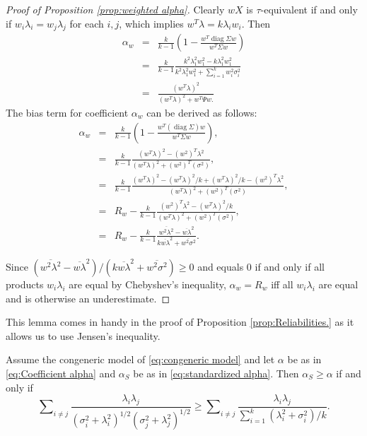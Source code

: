 \documentclass[twoside]{article}
\DeclareMathOperator{\diag}{diag}
\DeclareMathOperator{\tsum}{\textstyle \sum}
\renewcommand{\sqrt}[1]{{(#1)^{1/2}}}
\begin{document}
\begin{proof}[Proof of Proposition \ref{prop:weighted alpha}]
\label{proof:weighted alpha}Clearly $wX$ is $\tau$-equivalent
if and only if $w_{i}\lambda_{i}=w_{j}\lambda_{j}$ for each $i,j$,
which implies $w^{T}\lambda=k\lambda_{i}w_{i}$. Then
\begin{eqnarray*}
\alpha_{w} & = & \frac{k}{k-1}\left(1-\frac{w^{T}\diag\Sigma w}{w^{T}\Sigma w}\right)\\
 & = & \frac{k}{k-1}\frac{k^{2}\lambda_{1}^{2}w_{1}^{2}-k\lambda_{1}^{2}w_{1}^{2}}{k^{2}\lambda_{1}^{2}w_{1}^{2}+\tsum_{i=1}^{k}w_{i}^{2}\sigma_{i}^{2}}\\
 & = & \frac{(w^{T}\lambda)^{2}}{(w^{T}\lambda)^{2}+w^{T}\Psi w.}
\end{eqnarray*}
The bias term for coefficient $\alpha_w$ can be derived as follows:
\begin{eqnarray*}
\alpha_{w} & = & \frac{k}{k-1}(1-\frac{w^{T}(\diag\Sigma)w}{w^{T}\Sigma w}),\\
 & = & \frac{k}{k-1}\frac{(w^{T}\lambda)^{2}-(w^{2})^{T}\lambda^{2}}{(w^{T}\lambda)^{2}+(w^{2})^{T}(\sigma^{2})},\\
 & = & \frac{k}{k-1}\frac{(w^{T}\lambda)^{2}-(w^{T}\lambda)^{2}/k+(w^{T}\lambda)^{2}/k-(w^{2})^{T}\lambda^{2}}{(w^{T}\lambda)^{2}+(w^{2})^{T}(\sigma^{2})},\\
 & = &  R_{w}-\frac{k}{k-1}\frac{(w^{2})^{T}\lambda^{2}-(w^{T}\lambda)^{2}/k}{(w^{T}\lambda)^{2}+(w^{2})^{T}(\sigma^{2})},\\
 & = &  R_{w}-\frac{k}{k-1}\frac{\overline{w^{2}\lambda^{2}}-\overline{w\lambda}^{2}}{k\overline{w\lambda}^{2}+\overline{w^{2}\sigma^{2}}}.
\end{eqnarray*}

Since $(\overline{w^{2}\lambda^{2}}-\overline{w\lambda}^{2})/(k\overline{w\lambda}^{2}+\overline{w^{2}\sigma^{2}})\geq0$
and equals $0$ if and only if all products $w_i\lambda_i$ are equal by Chebyshev's inequality, $\alpha_w= R_w$
iff all $w_i\lambda_i$ are equal and is otherwise an underestimate. 


\end{proof}


This lemma comes in handy in the proof of Proposition \ref{prop:Reliabilities.} as it allows us to use Jensen's inequality.

\begin{lem}
\label{lem:alpha_s}
Assume the congeneric model of \eqref{eq:congeneric model} and let $\alpha$ be as in \eqref{eq:Coefficient alpha} and $\alpha_S$ be as in \eqref{eq:standardized alpha}. Then $\alpha_S\geq\alpha$
if and only if
\begin{equation}
\label{eq:Alpha-alpha_s inequality}
\tsum_{i\neq j}\frac{\lambda_{i}\lambda_{j}}{\sqrt{\sigma_{i}^{2}+\lambda_{i}^{2}}\sqrt{\sigma_j^{2}+\lambda_{j}^{2}}} 
\geq
\tsum_{i\neq j}\frac{\lambda_{i}\lambda_{j}}{\tsum_{i=1}^{k}(\lambda_{i}^{2}+\sigma_{i}^{2})/k}.
\end{equation}
\end{lem}
\end{document}
